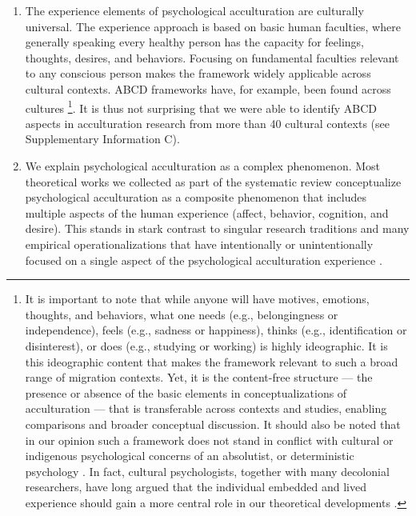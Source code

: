 \documentclass[man, 12pt, a4paper, mask]{apa7}
\begin{document}
\begin{enumerate}
\item The experience elements of psychological acculturation are culturally universal. The experience approach is based on basic human faculties, where generally speaking every healthy person has the capacity for feelings, thoughts, desires, and behaviors. Focusing on fundamental faculties relevant to any conscious person makes the framework widely applicable across cultural contexts. ABCD frameworks have, for example, been found across cultures \citep[e.g.,][]{Bhawuk2011}\footnote{It is important to note that while anyone will have motives, emotions, thoughts, and behaviors, what one needs (e.g., belongingness or independence), feels (e.g., sadness or happiness), thinks (e.g., identification or disinterest), or does (e.g., studying or working) is highly ideographic. It is this ideographic content that makes the framework relevant to such a broad range of migration contexts. Yet, it is the content-free structure --- the presence or absence of the basic elements in conceptualizations of acculturation --- that is transferable across contexts and studies, enabling comparisons and broader conceptual discussion. It should also be noted that in our opinion such a framework does not stand in conflict with cultural or indigenous psychological concerns of an absolutist, or deterministic psychology \citep[e.g.,][]{Kim2006a}. In fact, cultural psychologists, together with many decolonial researchers, have long argued that the individual embedded and lived experience should gain a more central role in our theoretical developments \citep[e.g., ontological turn;][]{Pedersen2020}.}. It is thus not surprising that we were able to identify ABCD aspects in acculturation research from more than 40 cultural contexts (see Supplementary Information C).

\item We explain psychological acculturation as a complex phenomenon. Most theoretical works we collected as part of the systematic review conceptualize psychological acculturation as a composite phenomenon that includes multiple aspects of the human experience (affect, behavior, cognition, and desire). This stands in stark contrast to singular research traditions and many empirical operationalizations that have intentionally or unintentionally focused on a single aspect of the psychological acculturation experience \citep[also see][]{Ward2001}.
\end{enumerate}
\end{document}
